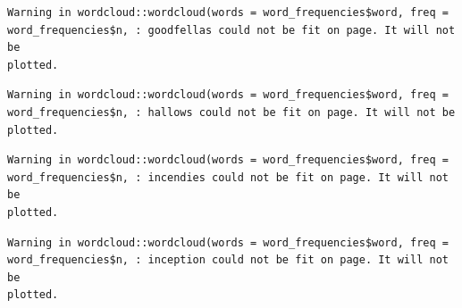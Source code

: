 \documentclass[
  letterpaper,
]{krantz}
\makeatletter
\newenvironment{Shaded}{\begin{snugshade}}{\end{snugshade}}
\newcommand{\AttributeTok}[1]{\textcolor[rgb]{0.40,0.45,0.13}{#1}}
\newcommand{\CommentTok}[1]{\textcolor[rgb]{0.37,0.37,0.37}{#1}}
\newcommand{\ConstantTok}[1]{\textcolor[rgb]{0.56,0.35,0.01}{#1}}
\newcommand{\DecValTok}[1]{\textcolor[rgb]{0.68,0.00,0.00}{#1}}
\newcommand{\FloatTok}[1]{\textcolor[rgb]{0.68,0.00,0.00}{#1}}
\newcommand{\FunctionTok}[1]{\textcolor[rgb]{0.28,0.35,0.67}{#1}}
\newcommand{\NormalTok}[1]{\textcolor[rgb]{0.00,0.23,0.31}{#1}}
\newcommand{\OtherTok}[1]{\textcolor[rgb]{0.00,0.23,0.31}{#1}}
\newcommand{\SpecialCharTok}[1]{\textcolor[rgb]{0.37,0.37,0.37}{#1}}
\newcommand{\StringTok}[1]{\textcolor[rgb]{0.13,0.47,0.30}{#1}}
\newenvironment{kframe}{%
\medskip{}
\setlength{\fboxsep}{.8em}
 \def\at@end@of@kframe{}%
 \ifinner\ifhmode%
  \def\at@end@of@kframe{\end{minipage}}%
  \begin{minipage}{\columnwidth}%
 \fi\fi%
 \def\FrameCommand##1{\hskip\@totalleftmargin \hskip-\fboxsep
 \colorbox{shadecolor}{##1}\hskip-\fboxsep
     \hskip-\linewidth \hskip-\@totalleftmargin \hskip\columnwidth}%
 \MakeFramed {\advance\hsize-\width
   \@totalleftmargin\z@ \linewidth\hsize
   \@setminipage}}%
 {\par\unskip\endMakeFramed%
 \at@end@of@kframe}
\renewenvironment{Shaded}{\begin{kframe}}{\end{kframe}}
\makeatother
\begin{document}
\begin{Shaded}
\end{Shaded}

\begin{verbatim}
Warning in wordcloud::wordcloud(words = word_frequencies$word, freq =
word_frequencies$n, : goodfellas could not be fit on page. It will not be
plotted.
\end{verbatim}

\begin{verbatim}
Warning in wordcloud::wordcloud(words = word_frequencies$word, freq =
word_frequencies$n, : hallows could not be fit on page. It will not be plotted.
\end{verbatim}

\begin{verbatim}
Warning in wordcloud::wordcloud(words = word_frequencies$word, freq =
word_frequencies$n, : incendies could not be fit on page. It will not be
plotted.
\end{verbatim}

\begin{verbatim}
Warning in wordcloud::wordcloud(words = word_frequencies$word, freq =
word_frequencies$n, : inception could not be fit on page. It will not be
plotted.
\end{verbatim}
\end{document}

